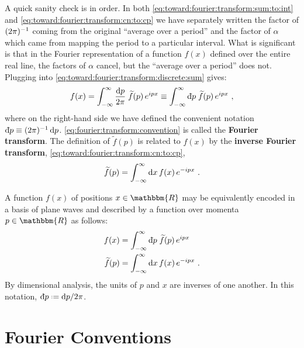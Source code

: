 \documentclass[12pt, oneside]{report}    %
\let\oldsection\section
\def\section{%
  \setcounter{sidenote}{1}%
  \oldsection
}
\begin{document}
A quick sanity check is in order. In both \eqref{eq:toward:fourier:transform:sum:to:int} and \eqref{eq:toward:fourier:transform:cn:to:cp} we have separately written the factor of $(2\pi)^{-1}$ coming from the original ``average over a period'' and the factor of $\alpha$ which came from mapping the period to a particular interval. What is significant is that in the Fourier representation of a function $f(x)$ defined over the entire real line, the factors of $\alpha$ cancel, but the ``average over a period'' does not. Plugging into \eqref{eq:toward:fourier:transform:discrete:sum} gives:
\begin{align}
    f(x) = \int_{-\infty}^\infty \frac{\D{p}}{2\pi}\; 
    \tilde f(p)\,
    e^{ipx} 
    \equiv 
    \int_{-\infty}^\infty \Dbar{p}\; 
    \tilde f(p)\,
    e^{ipx} 
    \ ,
\end{align}
where on the right-hand side we have defined the convenient notation $\Dbar{p} \equiv (2\pi)\inv \D{p}$. \eqref{eq:fourier:transform:convention} is called the \textbf{Fourier transform}. The definition of $\tilde f(p)$ is related to $f(x)$ by the \textbf{inverse Fourier transform}, \eqref{eq:toward:fourier:transform:cn:to:cp},
\begin{align}
    \widetilde f(p) = 
    \int_{-\infty}^\infty \operatorname{d}\!{x}\, f(x)\, e^{-ipx} 
    \ .
\end{align}


\begin{newrule}\label{rule:Fourier:transform:standard}
A function $f(x)$ of positions $x\in \mathbbm{R}$ may be equivalently encoded in a basis of plane waves and described by a function over momenta $p\in \mathbbm{R}$ as follows:
\begin{align}
    f(x) &= 
    \int_{-\infty}^\infty \Dbar{p}\; 
    \tilde f(p)\,
    e^{ipx} 
    \label{eq:fourier:transform:convention}
\\
    \tilde f(p) &= 
    \int_{-\infty}^\infty \D{x}\, f(x)\, e^{-ipx} 
    \ .
    \label{eq:fourier:inverse:transform:convention}
\end{align}
By dimensional analysis, the units of $p$ and $x$ are inverses of one another. In this notation, $\Dbar{p}\defeq \D{p}/2\pi$.
\end{newrule}

\section{Fourier Conventions}
\end{document}
